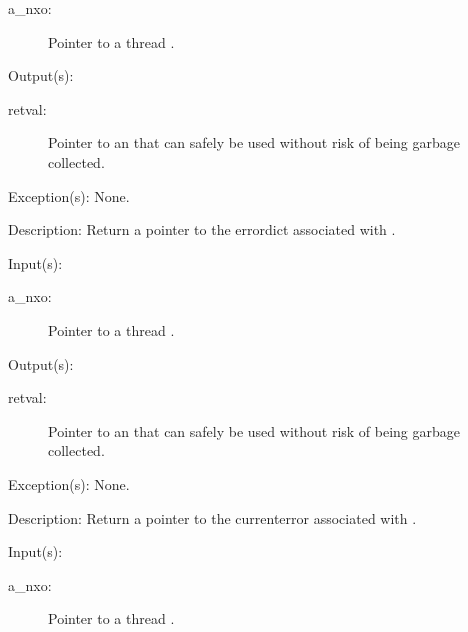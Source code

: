 \begin{capi}
\begin{capilist}
		\begin{description}\item[]
		\item[a\_nxo: ]
			Pointer to a thread .
		\end{description}
	\item[Output(s): ]
		\begin{description}\item[]
		\item[retval: ]
			Pointer to an  that can safely be used
			without risk of being garbage collected.
		\end{description}
	\item[Exception(s): ] None.
	\item[Description: ]
		Return a pointer to the errordict associated with .
	\end{capilist}
\label{nxo_thread_currenterror_get}
	\begin{capilist}
	\item[Input(s): ]
		\begin{description}\item[]
		\item[a\_nxo: ]
			Pointer to a thread .
		\end{description}
	\item[Output(s): ]
		\begin{description}\item[]
		\item[retval: ]
			Pointer to an  that can safely be used
			without risk of being garbage collected.
		\end{description}
	\item[Exception(s): ] None.
	\item[Description: ]
		Return a pointer to the currenterror associated with
		.
	\end{capilist}
\label{nxo_thread_ostack_get}
	\begin{capilist}
	\item[Input(s): ]
		\begin{description}\item[]
		\item[a\_nxo: ]
			Pointer to a thread \classname{nxo}.

\end{description}
\end{capilist}
\end{capi}

